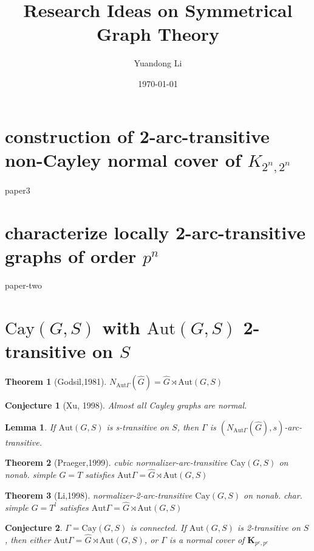 \documentclass[a4,11pt]{article}
\title{Research Ideas on Symmetrical Graph Theory}
\author{Yuandong Li}
\date{\today}
\newtheorem{theorem}{Theorem}[section]
\newtheorem{lemma}{Lemma}[theorem]
\newtheorem{conjecture}{Conjecture}[section]
\def\Aut{\mathrm{Aut}}
\def\Cay{\mathrm{Cay}}
\begin{document}
\maketitle

\tableofcontents
\newpage


\section{construction of 2-arc-transitive non-Cayley normal cover of $K_{2^n,2^n}$}
paper3


\section{characterize locally 2-arc-transitive graphs of order $p^n$}
paper-two



\section{$\Cay(G,S)$ with $\Aut(G,S)$ 2-transitive on $S$}

\begin{theorem}[Godsil,1981]
	$N_{\Aut\Gamma}(\hat{G})=\hat{G}\rtimes \Aut(G,S)$
\end{theorem}

\begin{conjecture}[Xu, 1998]
	Almost all Cayley graphs are normal.
\end{conjecture}


\begin{lemma}
	If $\Aut(G,S)$ is s-transitive on $S$, then $\Gamma$ is $(N_{\Aut\Gamma}(\hat{G}),s)$-arc-transitive.
\end{lemma}

\begin{theorem}[Praeger,1999]
	cubic normalizer-arc-transitive $\Cay(G,S)$ on nonab. simple $G=T$ satisfies $\Aut\Gamma=\hat{G}\rtimes \Aut(G,S)$
\end{theorem}

\begin{theorem}[Li,1998]
	normalizer-2-arc-transitive  $\Cay(G,S)$ on nonab. char. simple $G=T^l$ satisfies $\Aut\Gamma=\hat{G}\rtimes \Aut(G,S)$
\end{theorem}

\begin{conjecture}
	$\Gamma=\Cay(G,S)$ is connected. If $\Aut(G,S)$ is 2-transitive on $S$, then either $\Aut\Gamma=\hat{G}\rtimes \Aut(G,S)$, or $\Gamma$ is a normal cover of $\mathbf{K}_{p^e,p^e}$
\end{conjecture}
\end{document}
